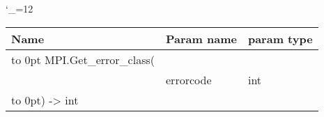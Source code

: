 \begingroup \catcode`\_=12 \tt
\begin{tabular}{lll}
\toprule
\textrm{Name}&\textrm{Param name}&\textrm{param type}\\
\midrule
\hbox to 0pt {MPI.Get_error_class(\hss}\\
& errorcode & int\\
\hbox to 0pt{) -> int\hss}\\
\bottomrule
\end{tabular}
\endgroup
